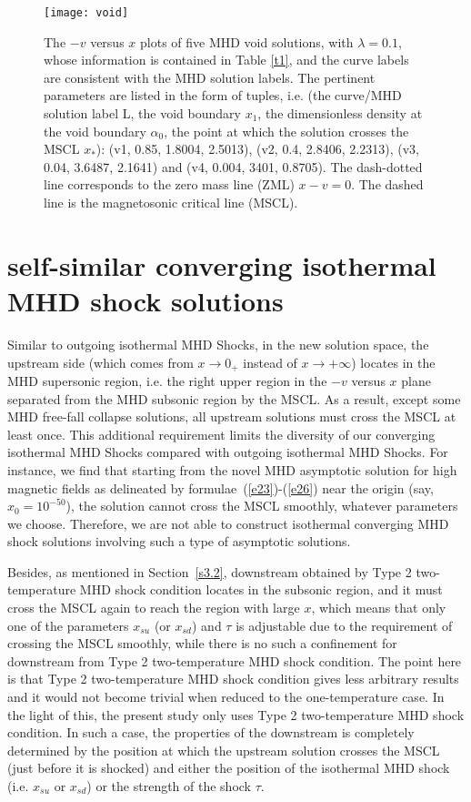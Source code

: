 \documentclass[fleqn,usenatbib]{mnras}
\begin{document}
\begin{figure}
\centering
\texttt{[image: void]}
\caption{
The $-v$ versus $x$ plots of five  MHD void solutions, with $\lambda=0.1$, whose information is contained in Table \ref{t1}, and the curve labels are consistent with the MHD solution labels. The pertinent parameters are listed in the form of tuples, i.e. (the curve/MHD solution label L, the void boundary $x_{1}$, the dimensionless density at the void boundary $\alpha_{0}$, the point at which the solution crosses the MSCL $x_{*}$): (v1, 0.85, 1.8004, 2.5013), (v2, 0.4, 2.8406, 2.2313), (v3, 0.04, 3.6487, 2.1641) and (v4, 0.004, 3401, 0.8705). The dash-dotted line corresponds to the zero mass line (ZML) $x-v=0$. The dashed line is the magnetosonic critical line (MSCL). }
\label{2}
\end{figure}


\section{self-similar converging isothermal MHD shock solutions}
\label{s5}
Similar to outgoing isothermal MHD Shocks, in the new solution space, the upstream side (which comes from $x\rightarrow 0_{+}$ instead of $x\rightarrow +\infty$) locates in the MHD supersonic region, i.e. the right upper region in the $-v$ versus $x$ plane separated from the MHD subsonic region by the MSCL. As a result, except some MHD free-fall collapse solutions, all upstream solutions must cross the MSCL at least once. This additional requirement limits the diversity 
of our converging isothermal MHD Shocks compared with outgoing isothermal MHD Shocks. For instance, we find that starting from the novel MHD asymptotic solution for high magnetic fields as delineated by formulae~(\ref{e23})-(\ref{e26}) near the origin (say, $x_{0}=10^{-50}$), the solution cannot cross the MSCL smoothly, whatever parameters we choose. Therefore, we are not able to construct isothermal converging MHD shock solutions involving such a type of asymptotic solutions.

Besides, as mentioned in Section~\ref{s3.2}, downstream obtained by Type 2 two-temperature MHD shock condition locates in the subsonic region, and it must cross the MSCL again to reach the region with large $x$, which means that only one of the parameters $x_{su}$ (or $x_{sd}$) and $\tau$ is adjustable due to the requirement of crossing the MSCL smoothly, while there is no such a confinement for downstream from Type 2 two-temperature MHD shock condition. The point here is that Type 2 two-temperature MHD shock condition gives less arbitrary results and it would not become trivial when reduced to the one-temperature case. In the light of this, the present study only uses Type 2 two-temperature MHD shock condition. In such a case, the properties of the downstream is completely determined by the position at which the upstream solution crosses the MSCL (just before it is shocked) and either the position of the isothermal MHD shock (i.e. $x_{su}$ or $x_{sd}$) or the strength of the shock $\tau$. 
\end{document}
